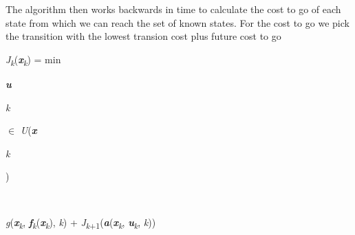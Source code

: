 \documentclass[12pt,twoside]{article}
\begin{document}
\vspace{\baselineskip}
\begin{adjustwidth}{0.08in}{0.58in}
{\fontsize{10pt}{12.0pt}\selectfont The algorithm then works backwards in time to calculate the cost to go of each state from which we can reach the set of known states. For the cost to go we pick the transition with the lowest transion cost plus future cost to go\par}\par

\end{adjustwidth}


\vspace{\baselineskip}

\vspace{\baselineskip}
\begin{multicols}{2}
\begin{FlushLeft}
{\fontsize{10pt}{12.0pt}\selectfont \textit{J\textsubscript{k}}(\textbf{\textit{x}}\textit{\textsubscript{k}}) = \tabto{2.44in} min\par}
\end{FlushLeft}\par

\begin{FlushRight}
{\fontsize{7pt}{8.4pt}\selectfont \textbf{\textit{u}}{\fontsize{6pt}{7.2pt}\selectfont \textit{k }{\fontsize{7pt}{8.4pt}\selectfont $ \in $ \textit{U}(\textbf{\textit{x}}{\fontsize{6pt}{7.2pt}\selectfont \textit{k }{\fontsize{7pt}{8.4pt}\selectfont )\par}\par}\par}\par}\par}
\end{FlushRight}\par

\begin{FlushLeft}
\\
{\fontsize{10pt}{12.0pt}\selectfont \textit{g}(\textbf{\textit{x}}\textit{\textsubscript{k}}, \textbf{\textit{f}}\textit{\textsubscript{k}}(\textbf{\textit{x}}\textit{\textsubscript{k}}), \textit{k}) + \textit{J\textsubscript{k}}\textsubscript{+1}(\textbf{\textit{a}}(\textbf{\textit{x}}\textit{\textsubscript{k}}, \textbf{\textit{u}}\textit{\textsubscript{k}}, \textit{k}))\par}
\end{FlushLeft}\par


\vspace{\baselineskip}

\end{multicols}
\end{document}

